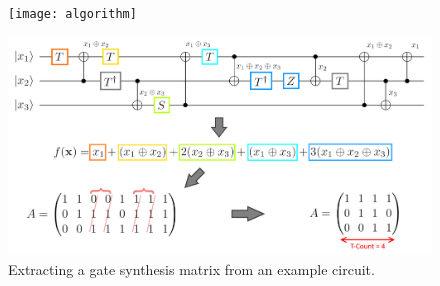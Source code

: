 \documentclass[a0,landscape]{a0poster}
\begin{document}
\begin{multicols}{3}
\begin{minipage}[b]{\linewidth}
\begin{tcolorbox}[title=\textcolor{white}{\huge\textbf{\textsf{Extended Lempel Algorithm}\textcolor{black}{y}}}]
\begin{multicols}{2}
				\begin{figure}
					\centering
					\texttt{[image: algorithm]}
				\end{figure}
			\end{multicols}

			
		\end{tcolorbox}
		\centering
		\begin{tcolorbox}[reset,colback=gray!75,colframe=black,width=0.95\linewidth,left=1cm,right=1cm,top=0.5cm,bottom=0.5cm]
			\begin{figure}
				\centering
				\includegraphics[width=\linewidth,cfbox=gray!75 1pt 1pt]{quant_circ1}
				\caption{Extracting a gate synthesis matrix from an example circuit.}
			\end{figure}
		\end{tcolorbox}


\end{minipage}
\end{multicols}
\end{document}
